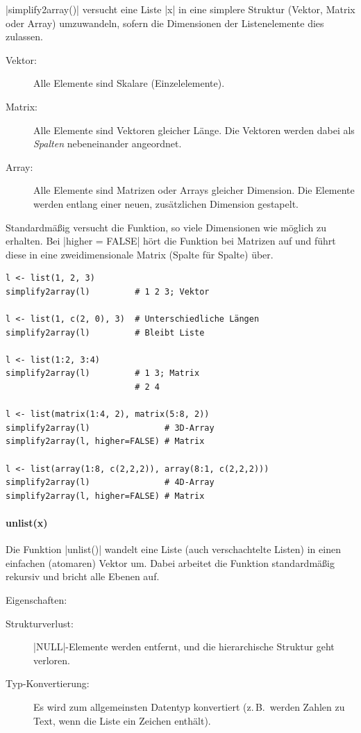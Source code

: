 \documentclass[10pt,twocolumn]{scrartcl}
\renewcommand{\lstinline}{\mycoloredinline}
\begin{document}
\lstinline|simplify2array()| versucht eine Liste \lstinline|x| in eine simplere Struktur (Vektor, Matrix oder Array) umzuwandeln, sofern die Dimensionen der Listenelemente dies zulassen.

\begin{description}
\item[Vektor:] Alle Elemente sind Skalare (Einzelelemente).
\item[Matrix:] Alle Elemente sind Vektoren gleicher Länge. Die Vektoren werden dabei als \emph{Spalten} nebeneinander angeordnet.
\item[Array:] Alle Elemente sind Matrizen oder Arrays gleicher Dimension. Die Elemente werden entlang einer neuen, zusätzlichen Dimension gestapelt.
\end{description}

Standardmäßig versucht die Funktion, so viele Dimensionen wie möglich zu erhalten. Bei \lstinline|higher = FALSE| hört die Funktion bei Matrizen auf und führt diese in eine zweidimensionale Matrix (Spalte für Spalte) über.

\begin{lstlisting}
l <- list(1, 2, 3)
simplify2array(l)         # 1 2 3; Vektor

l <- list(1, c(2, 0), 3)  # Unterschiedliche Längen
simplify2array(l)         # Bleibt Liste

l <- list(1:2, 3:4)
simplify2array(l)         # 1 3; Matrix
                          # 2 4

l <- list(matrix(1:4, 2), matrix(5:8, 2))
simplify2array(l)               # 3D-Array
simplify2array(l, higher=FALSE) # Matrix

l <- list(array(1:8, c(2,2,2)), array(8:1, c(2,2,2)))
simplify2array(l)               # 4D-Array
simplify2array(l, higher=FALSE) # Matrix
\end{lstlisting}


\paragraph{unlist(x)}

Die Funktion \lstinline|unlist()| wandelt eine Liste (auch verschachtelte Listen) in einen einfachen (atomaren) Vektor um. Dabei arbeitet die Funktion standardmäßig rekursiv und bricht alle Ebenen auf. 

Eigenschaften:
\begin{description}
\item[Strukturverlust:] \lstinline|NULL|-Elemente werden entfernt, und die hierarchische Struktur geht verloren.
\item[Typ-Konvertierung:] Es wird zum allgemeinsten Datentyp konvertiert (z.\,B.\ werden Zahlen zu Text, wenn die Liste ein Zeichen enthält).
\end{description}
\end{document}
